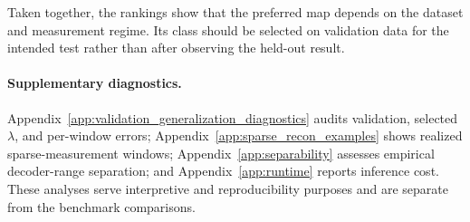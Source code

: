 Taken together, the rankings show that the preferred map depends on the
dataset and measurement regime. Its class should be selected on validation
data for the intended test rather than after observing the held-out result.

\paragraph{Supplementary diagnostics.}
Appendix~\ref{app:validation_generalization_diagnostics} audits validation,
selected $\lambda$, and per-window errors;
Appendix~\ref{app:sparse_recon_examples} shows realized sparse-measurement
windows; Appendix~\ref{app:separability} assesses empirical decoder-range
separation; and Appendix~\ref{app:runtime} reports inference cost. These
analyses serve interpretive and reproducibility purposes and are separate from
the benchmark comparisons.
